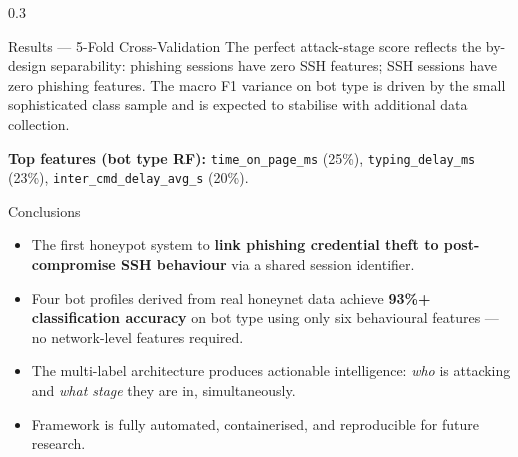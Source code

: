 \documentclass[final]{beamer}
\begin{document}
\begin{frame}[fragile]
\begin{columns}[t]
\begin{column}{0.3\paperwidth}
\begin{exampleblock}{Results — 5-Fold Cross-Validation}
\bigskip
The perfect attack-stage score reflects the by-design separability:
phishing sessions have zero SSH features; SSH sessions have zero
phishing features. The macro F1 variance on bot type is driven by the
small sophisticated class sample and is expected to stabilise with
additional data collection.

\bigskip
\textbf{Top features (bot type RF):} \texttt{time\_on\_page\_ms} (25\%),
\texttt{typing\_delay\_ms} (23\%), \texttt{inter\_cmd\_delay\_avg\_s} (20\%).
\end{exampleblock}

\begin{alertblock}{Conclusions}
\begin{itemize}
    \item The first honeypot system to \textbf{link phishing credential
          theft to post-compromise SSH behaviour} via a shared session
          identifier.
    \item Four bot profiles derived from real honeynet data achieve
          \textbf{93\%+ classification accuracy} on bot type using only
          six behavioural features — no network-level features required.
    \item The multi-label architecture produces actionable intelligence:
          \emph{who} is attacking and \emph{what stage} they are in,
          simultaneously.
    \item Framework is fully automated, containerised, and reproducible
          for future research.
\end{itemize}
\end{alertblock}

\end{column}
\separatorcolumn

\end{columns}
\end{frame}
\end{document}
